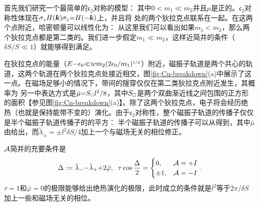 首先我们研究一个最简单的$\mathfrak{c}_2$对称的模型：
其中$0{<}m_1{\ll}m_2$并且$\mu$是正的。$\mathfrak{c}_2$对称性体现在$\sigma_z H(\boldsymbol{k})\sigma_z{=}H({-}\boldsymbol{k})$上，并且将 
处的两个狄拉克点联系在一起。在这两个点附近，哈密顿量可以线性化为：
从这里我们可以看出如果$m_1{<}m_2$，那么两个狄拉克点都是第二类的。我们进一步假定$m_1{\ll}m_2$，这样近简并的条件（$\delta S/S{\ll}1$）就能够得到满足。

在狄拉克点的能量（$E{-}\epsilon_0 {\ll} wm_2(2\epsilon_0/m_1)^{\scriptscriptstyle{1/2}}$）附近，磁振子轨道是两个共心的轨道，这两个轨道在两个狄拉克点处接近相交，图\ref{fig:Cn-breakdown}(a)中展示了这一点。在磁场足够小的情况下，带间的隧穿仅仅在第二类狄拉克点附近发生，其概率为
另一中表达方式是$\bar{\mu}{=}S_{\scriptscriptstyle{\square}}l^2/8$，其中$S_{\scriptscriptstyle{\square}}$是两个双曲渐近线之间包围的正方形的面积【参见图\ref{fig:Cn-breakdown}(a)】。除了这两个狄拉克点，电子将会经历绝热（也就是保持能带不变的）演化。由于$\mathfrak{c}_2$对称性，整个磁振子轨道的传播子仅仅是半个磁振子轨道传播子的的平方：
半个磁振子轨道的传播子可以从得到，其中$\bar{\mu}$由给出，而$\tilde{\lambda}_{\pm}{=}{\pm}l^2\delta S/4$加上一个与磁场无关的相位修正。

${\cal A}$简并的充要条件是 
\begin{align}
\Delta:= \tilde{\lambda}_-{-}\tilde{\lambda}_{+}{+}2\bar{\varphi},\;\;
\tau\cos\frac{\Delta}{2}= \begin{cases} 0, & {{\cal A}}=+I \\
                 \pm 1, & {\cal A} =-I\end{cases}.\label{c2breakdowndgncondition}
\end{align}
$\tau{=}1$和$\bar{\varphi}{=}0$的极限能够给出绝热演化的极限，此时成立的条件就是$l^2$等于$2\pi/\delta S$加上一些和磁场无关的相位。

